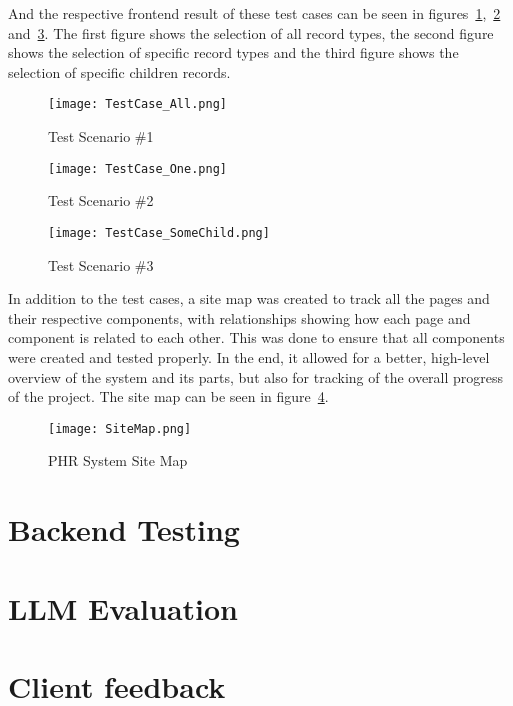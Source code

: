 And the respective frontend result of these test cases can be seen in figures~\ref{fig:test1},~\ref{fig:test2} and~\ref{fig:test3}. The first figure shows the selection of all record types, the second figure shows the selection of specific record types and the third figure shows the selection of specific children records.

\begin{figure}[htbp]
    \centering
    \texttt{[image: TestCase\_All.png]}
    \caption{Test Scenario \#1}\label{fig:test1}
\end{figure}


\begin{figure}[htbp]
    \centering
    \texttt{[image: TestCase\_One.png]}
    \caption{Test Scenario \#2}\label{fig:test2}
\end{figure}

\begin{figure}[htbp]
    \centering
    \texttt{[image: TestCase\_SomeChild.png]}
    \caption{Test Scenario \#3}\label{fig:test3}
\end{figure}

\FloatBarrier{}

In addition to the test cases, a site map was created to track all the pages and their respective components, with relationships showing how each page and component is related to each other. This was done to ensure that all components were created and tested properly. In the end, it allowed for a better, high-level overview of the system and its parts, but also for tracking of the overall progress of the project. The site map can be seen in figure~\ref{fig:sitemap}.

\begin{figure}[htbp]
    \centering
    \texttt{[image: SiteMap.png]}
    \caption{PHR System Site Map}\label{fig:sitemap}
\end{figure}

\FloatBarrier{}

\section{Backend Testing}

\section{LLM Evaluation}

\section{Client feedback}